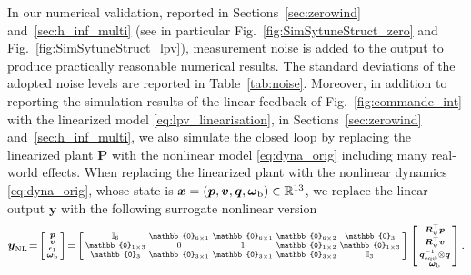 In our numerical validation, reported in Sections~\ref{sec:zerowind} and~\ref{sec:h_inf_multi} (see in particular Fig.~\ref{fig:SimSytuneStruct_zero} and Fig.~\ref{fig:SimSytuneStruct_lpv}),
measurement noise is added to the output to produce practically reasonable numerical results.
The standard deviations of the adopted noise levels are reported in Table~\ref{tab:noise}.
Moreover,
in addition to reporting the simulation results of the linear feedback of Fig.~\ref{fig:commande_int} with the linearized model \eqref{eq:lpv_linearisation}, 
in Sections~\ref{sec:zerowind} and~\ref{sec:h_inf_multi},
we also simulate the closed loop by replacing the linearized plant $\boldsymbol{P}$ with the 
nonlinear model \eqref{eq:dyna_orig} including many real-world effects.
When replacing the linearized plant with the nonlinear dynamics \eqref{eq:dyna_orig}, whose state is $\boldsymbol{x} = (\boldsymbol{p}, \boldsymbol{v},
         \boldsymbol{q},
         \boldsymbol{\omega}_{\text{b}}) \in {\mathbb R}^{13} $,
we replace the linear output $\boldsymbol{y}$ with the following surrogate nonlinear version
\begin{align}
\label{eq:output}
    \boldsymbol{y}_{\text{NL}} \!=\! \smallmat{\boldsymbol{p}\\
     \boldsymbol{v}\\
     \epsilon_{1}\\
     \boldsymbol{\omega}_{\text{b}}} \!=\! \left[ \begin{smallmatrix} \mathbb{I}_{6} & \mathbb{0}_{6\times 1} & \mathbb{0}_{6\times 1} & \mathbb{0}_{6\times 2} & \mathbb{0}_{3}\\
     \mathbb{0}_{1\times 3} & 0 & 1 & \mathbb{0}_{1\times 2} & \mathbb{0}_{1 \times 3} \\
         \mathbb{0}_{3} & \mathbb{0}_{3\times 1} & \mathbb{0}_{3\times 1} & \mathbb{0}_{3\times 2} &   \mathbb{I}_{3}
         \end{smallmatrix} \right]
         \smallmat{\boldsymbol{R}^\top_{\psi}\boldsymbol{p} \\ \boldsymbol{R}^\top_{\psi}\boldsymbol{v} \\
\boldsymbol{q}_{\mathrm{eq}\psi}^{-1} \otimes \boldsymbol{q} \\
         \boldsymbol{\omega}_{\text{b}}  }.
\end{align}
